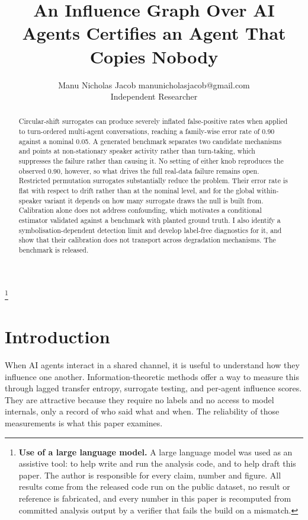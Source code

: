 \documentclass[10pt]{article}
\title{An Influence Graph Over AI Agents Certifies an Agent That Copies Nobody}
\author{\name Manu Nicholas Jacob \email manunicholasjacob@gmail.com \\
        \addr Independent Researcher}
\newcommand{\disclosurefootnote}[1]{%
  \begingroup\renewcommand\thefootnote{}\footnote{#1}\addtocounter{footnote}{-1}\endgroup}
\begin{document}
\maketitle

\begin{abstract}
Circular-shift surrogates can produce severely inflated false-positive rates when applied to
turn-ordered multi-agent conversations, reaching a family-wise error rate of 0.90 against a nominal
0.05. A generated benchmark separates two candidate mechanisms and points at non-stationary speaker
activity rather than turn-taking, which suppresses the failure rather than causing it. No setting of
either knob reproduces the observed 0.90, however, so what drives the full real-data failure remains
open. Restricted permutation surrogates substantially reduce the problem. Their error rate is flat
with respect to drift rather than at the nominal level, and for the global within-speaker variant it
depends on how many surrogate draws the null is built from. Calibration alone does not address
confounding, which motivates a conditional estimator validated against a benchmark with planted
ground truth. I also identify a symbolisation-dependent detection limit and develop label-free
diagnostics for it, and show that their calibration does not transport across degradation
mechanisms. The benchmark is released.
\end{abstract}

\disclosurefootnote{\textbf{Use of a large language model.} A large language model was used as an
assistive tool: to help write and run the analysis code, and to help draft this paper. The author is
responsible for every claim, number and figure. All results come from the released code run on the
public dataset, no result or reference is fabricated, and every number in this paper is recomputed
from committed analysis output by a verifier that fails the build on a mismatch.}

\section{Introduction}

When AI agents interact in a shared channel, it is useful to understand how they influence one
another. Information-theoretic methods offer a way to measure this through lagged transfer entropy,
surrogate testing, and per-agent influence scores. They are attractive because they require no
labels and no access to model internals, only a record of who said what and when. The reliability of
those measurements is what this paper examines.
\end{document}
